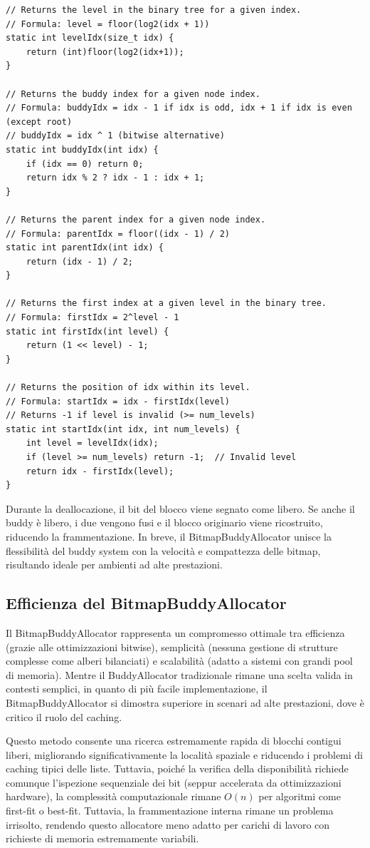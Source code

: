 \begin{lstlisting}
// Returns the level in the binary tree for a given index.
// Formula: level = floor(log2(idx + 1))
static int levelIdx(size_t idx) {
    return (int)floor(log2(idx+1));
}

// Returns the buddy index for a given node index.
// Formula: buddyIdx = idx - 1 if idx is odd, idx + 1 if idx is even (except root)
// buddyIdx = idx ^ 1 (bitwise alternative)
static int buddyIdx(int idx) {
    if (idx == 0) return 0;
    return idx % 2 ? idx - 1 : idx + 1;
}

// Returns the parent index for a given node index.
// Formula: parentIdx = floor((idx - 1) / 2)
static int parentIdx(int idx) {
    return (idx - 1) / 2;
}

// Returns the first index at a given level in the binary tree.
// Formula: firstIdx = 2^level - 1
static int firstIdx(int level) {
    return (1 << level) - 1;
}

// Returns the position of idx within its level.
// Formula: startIdx = idx - firstIdx(level)
// Returns -1 if level is invalid (>= num_levels)
static int startIdx(int idx, int num_levels) {
    int level = levelIdx(idx);
    if (level >= num_levels) return -1;  // Invalid level
    return idx - firstIdx(level);
}
\end{lstlisting}

Durante la deallocazione, il bit del blocco viene segnato come libero. Se anche il buddy è libero, i due vengono fusi e il blocco originario viene ricostruito, riducendo la frammentazione. In breve, il BitmapBuddyAllocator unisce la flessibilità del buddy system con la velocità e compattezza delle bitmap, risultando ideale per ambienti ad alte prestazioni.

\subsection*{Efficienza del BitmapBuddyAllocator}
Il BitmapBuddyAllocator rappresenta un compromesso ottimale tra efficienza (grazie alle ottimizzazioni bitwise), semplicità (nessuna gestione di strutture complesse come alberi bilanciati) e scalabilità (adatto a sistemi con grandi pool di memoria). Mentre il BuddyAllocator tradizionale rimane una scelta valida in contesti semplici, in quanto di più facile implementazione, il BitmapBuddyAllocator si dimostra superiore in scenari ad alte prestazioni, dove è critico il ruolo del caching. 

Questo metodo consente una ricerca estremamente rapida di blocchi contigui liberi, migliorando significativamente la località spaziale e riducendo i problemi di caching tipici delle liste. Tuttavia, poiché la verifica della disponibilità richiede comunque l’ispezione sequenziale dei bit (seppur accelerata da ottimizzazioni hardware), la complessità computazionale rimane $O(n)$ per algoritmi come first-fit o best-fit. Tuttavia, la frammentazione interna rimane un problema irrisolto, rendendo questo allocatore meno adatto per carichi di lavoro con richieste di memoria estremamente variabili.

